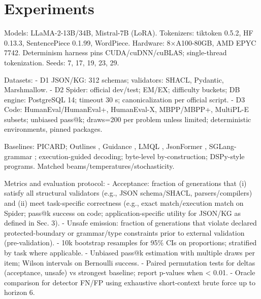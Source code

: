 \documentclass{article}
\begin{document}
\section{Experiments}
Models: LLaMA-2-13B/34B, Mistral-7B (LoRA). Tokenizers: tiktoken 0.5.2, HF 0.13.3, SentencePiece 0.1.99, WordPiece. Hardware: 8×A100-80GB, AMD EPYC 7742. Determinism harness pins CUDA/cuDNN/cuBLAS; single-thread tokenization. Seeds: 7, 17, 19, 23, 29.

Datasets: 
- D1 JSON/KG: 312 schemas; validators: SHACL, Pydantic, Marshmallow.
- D2 Spider: official dev/test; EM/EX; difficulty buckets; DB engine: PostgreSQL 14; timeout 30 s; canonicalization per official script.
- D3 Code: HumanEval/HumanEval+, HumanEval-X, MBPP/MBPP+, MultiPL-E subsets; unbiased pass@k; draws=200 per problem unless limited; deterministic environments, pinned packages.

Baselines: PICARD; Outlines \cite{outlines}, Guidance \cite{guidance}, LMQL \cite{lmql}, JsonFormer \cite{jsonformer}, SGLang-grammar \cite{sglang}; execution-guided decoding; byte-level by-construction; DSPy-style programs. Matched beams/temperatures/stochasticity.

Metrics and evaluation protocol:
- Acceptance: fraction of generations that (i) satisfy all structural validators (e.g., JSON schema/SHACL, parsers/compilers) and (ii) meet task-specific correctness (e.g., exact match/execution match on Spider; pass@k success on code; application-specific utility for JSON/KG as defined in Sec. 3).
- Unsafe emission: fraction of generations that violate declared protected-boundary or grammar/type constraints prior to external validation (pre-validation).
- 10k bootstrap resamples for 95\% CIs on proportions; stratified by task where applicable.
- Unbiased pass@k estimation with multiple draws per item; Wilson intervals on Bernoulli success.
- Paired permutation tests for deltas (acceptance, unsafe) vs strongest baseline; report p-values when < 0.01.
- Oracle comparison for detector FN/FP using exhaustive short-context brute force up to horizon 6.
\end{document}
